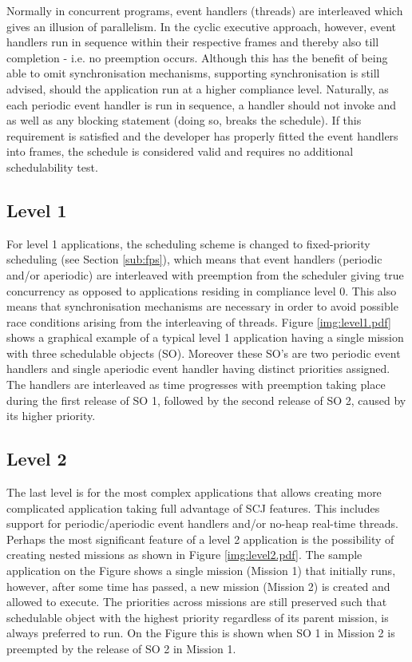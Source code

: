 
Normally in concurrent programs, event handlers (threads) are interleaved which gives an illusion of parallelism. In the cyclic executive approach, however, event handlers run in sequence within their respective frames and thereby also till completion - i.e. no preemption occurs. Although this has the benefit of being able to omit synchronisation mechanisms, supporting synchronisation is still advised, should the application run at a higher compliance level. Naturally, as each periodic event handler is run in sequence, a handler should not invoke  and  as well as any blocking statement (doing so, breaks the schedule). If this requirement is satisfied and the developer has properly fitted the event handlers into frames, the schedule is considered valid and requires no additional schedulability test.

\subsection{Level 1}
For level 1 applications, the scheduling scheme is changed to fixed-priority scheduling (see Section \ref{sub:fps}), which means that event handlers (periodic and/or aperiodic) are interleaved with preemption from the scheduler giving true concurrency as opposed to applications residing in compliance level 0. This also means that synchronisation mechanisms are necessary in order to avoid possible race conditions arising from the interleaving of threads. Figure \ref{img:level1.pdf} shows a graphical example of a typical level 1 application having a single mission with three schedulable objects (SO). Moreover these SO's are two periodic event handlers and single aperiodic event handler having distinct priorities assigned. The handlers are interleaved as time progresses with preemption taking place during the first release of SO 1, followed by the second release of SO 2, caused by its higher priority.


\subsection{Level 2}
The last level is for the most complex applications that allows creating more complicated application taking full advantage of SCJ features. This includes support for periodic/aperiodic event handlers and/or no-heap real-time threads. Perhaps the most significant feature of a level 2 application is the possibility of creating nested missions as shown in Figure \ref{img:level2.pdf}. The sample application on the Figure shows a single mission (Mission 1) that initially runs, however, after some time has passed, a new mission (Mission 2) is created and allowed to execute. The priorities across missions are still preserved such that schedulable object with the highest priority regardless of its parent mission, is always preferred to run. On the Figure this is shown when SO 1 in Mission 2 is preempted by the release of SO 2 in Mission 1.

